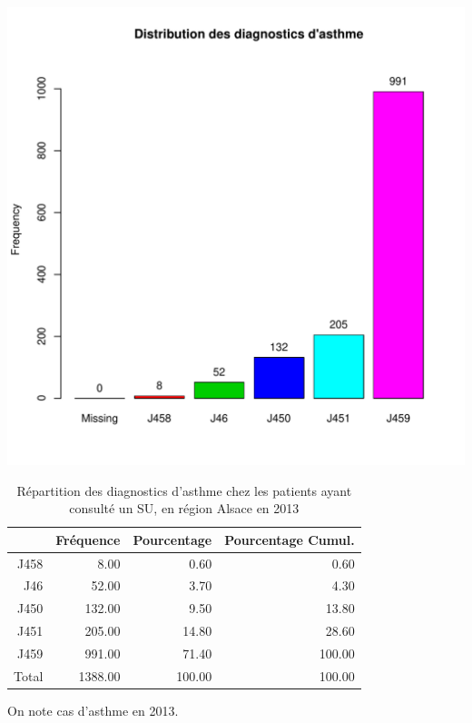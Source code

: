 \documentclass[12pt,english,french,twoside]{book}\usepackage[]{graphicx}\usepackage[]{color}
\makeatletter
\def\maxwidth{ %
  \ifdim\Gin@nat@width>\linewidth
    \linewidth
  \else
    \Gin@nat@width
  \fi
}
\makeatother
\begin{document}
\includegraphics[width=\maxwidth]{figure/asthme} 
\begin{table}[ht]
\centering
\begin{tabular}{rrrr}
  \hline
 & Fréquence & Pourcentage & Pourcentage Cumul. \\ 
  \hline
J458 & 8.00 & 0.60 & 0.60 \\ 
  J46 & 52.00 & 3.70 & 4.30 \\ 
  J450 & 132.00 & 9.50 & 13.80 \\ 
  J451 & 205.00 & 14.80 & 28.60 \\ 
  J459 & 991.00 & 71.40 & 100.00 \\ 
    Total & 1388.00 & 100.00 & 100.00 \\ 
   \hline
\end{tabular}
\caption[Répartition des diagnostics d'asthme]{Répartition des diagnostics d'asthme chez les patients ayant consulté un  SU, en région Alsace en 2013} 
\label{tab:asthme}
\end{table}



On note  cas d'asthme en 2013.
\end{document}
